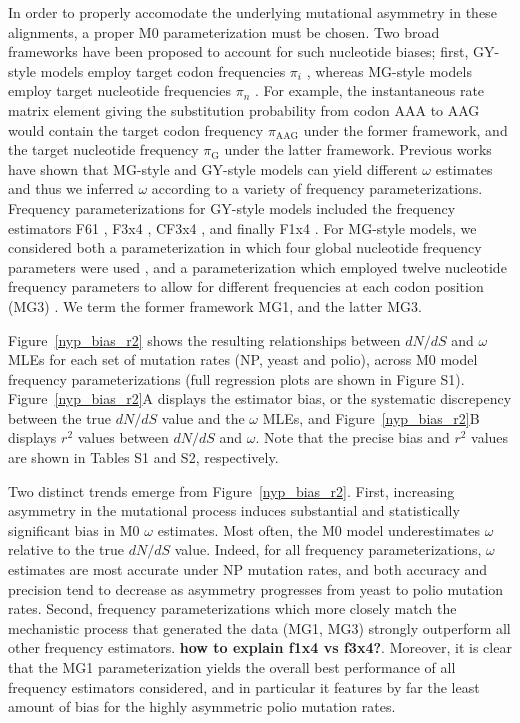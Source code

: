 \documentclass{pnastwo}
\begin{document}
\begin{article}
In order to properly accomodate the underlying mutational asymmetry in these alignments, a proper M0 parameterization must be chosen. Two broad frameworks have been proposed to account for such nucleotide biases; first, GY-style models employ target codon frequencies $\pi_i$ \cite{GoldmanYang1994}, whereas MG-style models employ target nucleotide frequencies $\pi_n$ \cite{MuseGaut1994}. For example, the instantaneous rate matrix element giving the substitution probability from codon AAA to AAG would contain the target codon frequency $\pi_\text{AAG}$ under the former framework, and the target nucleotide frequency $\pi_\text{G}$ under the latter framework. Previous works have shown that MG-style and GY-style models can yield different $\omega$  estimates \cite{KosakovskyPondMuse2005,Yap2010} and thus we inferred $\omega$ according to a variety of frequency parameterizations. Frequency parameterizations for GY-style models included the frequency estimators F61 \cite{GoldmanYang1994}, F3x4 \cite{GoldmanYang1994}, CF3x4 \cite{KosakovskyPond2010}, and finally F1x4 \cite{MuseGaut1994}. For MG-style models, we considered both a parameterization in which four global nucleotide frequency parameters were used \cite{MuseGaut1994}, and a parameterization which employed twelve nucleotide frequency parameters to allow for different frequencies at each codon position (MG3) \cite{KosakovskyPondMuse2005}. We term the former framework MG1, and the latter MG3.


Figure~\ref{nyp_bias_r2} shows the resulting relationships between $dN/dS$ and $\omega$ MLEs for each set of mutation rates (NP, yeast and polio), across M0 model frequency parameterizations (full regression plots are shown in Figure S1). Figure~\ref{nyp_bias_r2}A displays the estimator bias, or the systematic discrepency between the true $dN/dS$ value and the $\omega$ MLEs, and Figure~\ref{nyp_bias_r2}B displays $r^2$ values between $dN/dS$ and $\omega$. Note that the precise bias and $r^2$ values are shown in Tables S1 and S2, respectively.

Two distinct trends emerge from Figure~\ref{nyp_bias_r2}. First, increasing asymmetry in the mutational process induces substantial and statistically significant bias in M0 $\omega$ estimates. Most often, the M0 model underestimates $\omega$ relative to the true $dN/dS$ value.  Indeed, for all frequency parameterizations, $\omega$ estimates are most accurate under NP mutation rates, and both accuracy and precision tend to decrease as asymmetry progresses from yeast to polio mutation rates. Second, frequency parameterizations which more closely match the mechanistic process that generated the data (MG1, MG3) strongly outperform all other frequency estimators. \textbf{how to explain f1x4 vs f3x4?}. Moreover, it is clear that the MG1 parameterization yields the overall best performance of all frequency estimators considered, and in particular it features by far the least amount of bias for the highly asymmetric polio mutation rates. 


\end{article}
\end{document}
